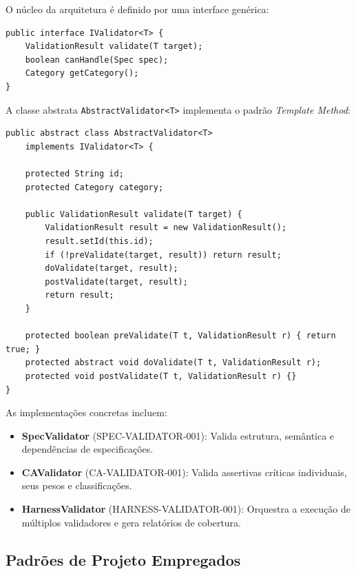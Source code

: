 \documentclass[
  brazil,
  sumario=tradicional,
  10pt
]{abntex2}
\begin{document}
O núcleo da arquitetura é definido por uma interface genérica:

\begin{lstlisting}[style=javastyle, caption={Interface IValidator<T>}]
public interface IValidator<T> {
    ValidationResult validate(T target);
    boolean canHandle(Spec spec);
    Category getCategory();
}
\end{lstlisting}

A classe abstrata \texttt{AbstractValidator<T>} implementa o padrão
\textit{Template Method}:

\begin{lstlisting}[style=javastyle, caption={AbstractValidator -- Template Method}]
public abstract class AbstractValidator<T>
    implements IValidator<T> {

    protected String id;
    protected Category category;

    public ValidationResult validate(T target) {
        ValidationResult result = new ValidationResult();
        result.setId(this.id);
        if (!preValidate(target, result)) return result;
        doValidate(target, result);
        postValidate(target, result);
        return result;
    }

    protected boolean preValidate(T t, ValidationResult r) { return true; }
    protected abstract void doValidate(T t, ValidationResult r);
    protected void postValidate(T t, ValidationResult r) {}
}
\end{lstlisting}

As implementações concretas incluem:

\begin{itemize}
  \item \textbf{SpecValidator} (SPEC-VALIDATOR-001): Valida estrutura,
    semântica e dependências de especificações.
  \item \textbf{CAValidator} (CA-VALIDATOR-001): Valida assertivas
    críticas individuais, seus pesos e classificações.
  \item \textbf{HarnessValidator} (HARNESS-VALIDATOR-001): Orquestra a
    execução de múltiplos validadores e gera relatórios de cobertura.
\end{itemize}

\subsection{Padrões de Projeto Empregados}
\end{document}
